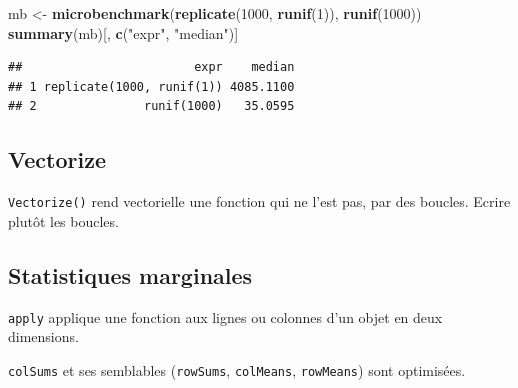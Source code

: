 \documentclass[
  12pt,
  french,
  a4paper,
  extrafontsizes,onecolumn,openright
  ]{memoir}
\newenvironment{Shaded}{\begin{snugshade}}{\end{snugshade}}
\newcommand{\DecValTok}[1]{\textcolor[rgb]{0.00,0.00,0.81}{#1}}
\newcommand{\KeywordTok}[1]{\textcolor[rgb]{0.13,0.29,0.53}{\textbf{#1}}}
\newcommand{\NormalTok}[1]{#1}
\newcommand{\StringTok}[1]{\textcolor[rgb]{0.31,0.60,0.02}{#1}}
\begin{document}
\scriptsize

\begin{Shaded}
\begin{Highlighting}[]
\NormalTok{mb <-}\StringTok{ }\KeywordTok{microbenchmark}\NormalTok{(}\KeywordTok{replicate}\NormalTok{(}\DecValTok{1000}\NormalTok{, }\KeywordTok{runif}\NormalTok{(}\DecValTok{1}\NormalTok{)), }\KeywordTok{runif}\NormalTok{(}\DecValTok{1000}\NormalTok{))}
\KeywordTok{summary}\NormalTok{(mb)[, }\KeywordTok{c}\NormalTok{(}\StringTok{"expr"}\NormalTok{, }\StringTok{"median"}\NormalTok{)]}
\end{Highlighting}
\end{Shaded}

\begin{verbatim}
##                        expr    median
## 1 replicate(1000, runif(1)) 4085.1100
## 2               runif(1000)   35.0595
\end{verbatim}

\normalsize

\hypertarget{vectorize}{%
\subsection{Vectorize}\label{vectorize}}

\texttt{Vectorize()} rend vectorielle une fonction qui ne l'est pas, par des boucles.
Ecrire plutôt les boucles.

\hypertarget{statistiques-marginales}{%
\subsection{Statistiques marginales}\label{statistiques-marginales}}

\texttt{apply} applique une fonction aux lignes ou colonnes d'un objet en deux dimensions.

\texttt{colSums} et ses semblables (\texttt{rowSums}, \texttt{colMeans}, \texttt{rowMeans}) sont optimisées.

\scriptsize
\end{document}
